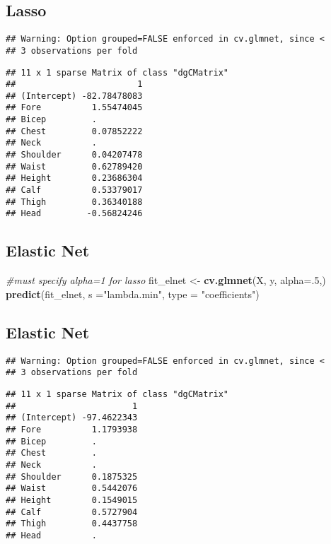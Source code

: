 \documentclass[]{article}
\newenvironment{Shaded}{\begin{snugshade}}{\end{snugshade}}
\newcommand{\KeywordTok}[1]{\textcolor[rgb]{0.13,0.29,0.53}{\textbf{#1}}}
\newcommand{\DataTypeTok}[1]{\textcolor[rgb]{0.13,0.29,0.53}{#1}}
\newcommand{\DecValTok}[1]{\textcolor[rgb]{0.00,0.00,0.81}{#1}}
\newcommand{\StringTok}[1]{\textcolor[rgb]{0.31,0.60,0.02}{#1}}
\newcommand{\CommentTok}[1]{\textcolor[rgb]{0.56,0.35,0.01}{\textit{#1}}}
\newcommand{\NormalTok}[1]{#1}
\begin{document}
\subsection{Lasso}\label{lasso-1}

\begin{verbatim}
## Warning: Option grouped=FALSE enforced in cv.glmnet, since <
## 3 observations per fold
\end{verbatim}

\begin{verbatim}
## 11 x 1 sparse Matrix of class "dgCMatrix"
##                        1
## (Intercept) -82.78478083
## Fore          1.55474045
## Bicep         .         
## Chest         0.07852222
## Neck          .         
## Shoulder      0.04207478
## Waist         0.62789420
## Height        0.23686304
## Calf          0.53379017
## Thigh         0.36340188
## Head         -0.56824246
\end{verbatim}

\subsection{Elastic Net}\label{elastic-net}

\begin{Shaded}
\begin{Highlighting}[]
\CommentTok{#must specify alpha=1 for lasso}
\NormalTok{fit_elnet <-}\StringTok{ }\KeywordTok{cv.glmnet}\NormalTok{(X, y, }\DataTypeTok{alpha=}\NormalTok{.}\DecValTok{5}\NormalTok{,)}
\KeywordTok{predict}\NormalTok{(fit_elnet, }\DataTypeTok{s =}\StringTok{"lambda.min"}\NormalTok{, }\DataTypeTok{type =} \StringTok{"coefficients"}\NormalTok{)}
\end{Highlighting}
\end{Shaded}

\subsection{Elastic Net}\label{elastic-net-1}

\begin{verbatim}
## Warning: Option grouped=FALSE enforced in cv.glmnet, since <
## 3 observations per fold
\end{verbatim}

\begin{verbatim}
## 11 x 1 sparse Matrix of class "dgCMatrix"
##                       1
## (Intercept) -97.4622343
## Fore          1.1793938
## Bicep         .        
## Chest         .        
## Neck          .        
## Shoulder      0.1875325
## Waist         0.5442076
## Height        0.1549015
## Calf          0.5727904
## Thigh         0.4437758
## Head          .
\end{verbatim}
\end{document}
